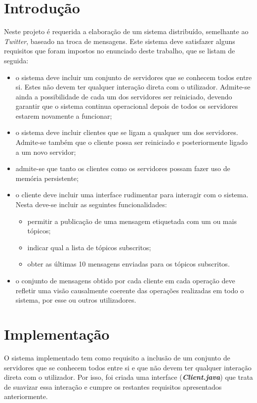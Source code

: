 \documentclass[a4paper]{report}
\begin{document}
\chapter{Introdução} \label{intro}
\large{
	Neste projeto é requerida a elaboração de um sistema distribuído, semelhante ao \textit{Twitter}, baseado na troca de mensagens. Este sistema deve satisfazer alguns requisitos que foram impostos no enunciado deste trabalho, que se listam de seguida:
	\begin{itemize}
		\item o sistema deve incluir um conjunto de servidores que se conhecem todos entre si. Estes não devem ter qualquer interação direta com o utilizador. Admite-se ainda a possibilidade de cada um dos servidores ser reiniciado, devendo garantir que o sistema continua operacional depois de todos os servidores estarem novamente a funcionar;
		\item o sistema deve incluir clientes que se ligam a qualquer um dos servidores. Admite-se também que o cliente possa ser reiniciado e posteriormente ligado a um novo servidor;
		\item admite-se que tanto os clientes como os servidores possam fazer uso de memória persistente;
		\item o cliente deve incluir uma interface rudimentar para interagir com o sistema. Nesta deve-se incluir as seguintes funcionalidades:
		\begin{itemize}
			\item permitir a publicação de uma mensagem etiquetada com um ou mais tópicos;
			\item indicar qual a lista de tópicos subscritos;
			\item obter as últimas 10 mensagens enviadas para os tópicos subscritos.
		\end{itemize}
		\item o conjunto de mensagens obtido por cada cliente em cada operação deve refletir uma visão causalmente coerente das operações realizadas em todo o sistema, por esse ou outros utilizadores.
	\end{itemize}
}

\chapter{Implementação}
	O sistema implementado tem como requisito a inclusão de um conjunto de servidores que se conhecem todos entre si e que não devem ter qualquer interação direta com o utilizador.
	Por isso, foi criada uma interface (\textbf{\textit{Client.java}}) que trata de suavizar essa interação e cumpre os restantes requisitos apresentados anteriormente.
\end{document}
